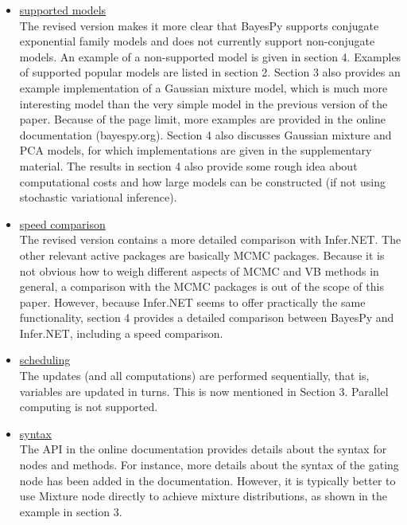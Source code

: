 \documentclass{article}
\begin{document}
\begin{itemize}

\item \underline{supported models}
  \\
  The revised version makes it more clear that BayesPy supports conjugate
  exponential family models and does not currently support non-conjugate models.
  An example of a non-supported model is given in section 4.  Examples of
  supported popular models are listed in section 2.  Section 3 also provides an
  example implementation of a Gaussian mixture model, which is much more
  interesting model than the very simple model in the previous version of the
  paper.  Because of the page limit, more examples are provided in the online
  documentation (bayespy.org).  Section 4 also discusses Gaussian mixture and
  PCA models, for which implementations are given in the supplementary material.
  The results in section 4 also provide some rough idea about computational
  costs and how large models can be constructed (if not using stochastic
  variational inference).

\item \underline{speed comparison}
  \\
  The revised version contains a more detailed comparison with Infer.NET.  The
  other relevant active packages are basically MCMC packages.  Because it is not
  obvious how to weigh different aspects of MCMC and VB methods in general, a
  comparison with the MCMC packages is out of the scope of this paper.  However,
  because Infer.NET seems to offer practically the same functionality, section 4
  provides a detailed comparison between BayesPy and Infer.NET, including a
  speed comparison.

\item \underline{scheduling}
  \\
  The updates (and all computations) are performed sequentially, that is,
  variables are updated in turns.  This is now mentioned in Section 3.  Parallel
  computing is not supported.

\item \underline{syntax}
  \\
  The API in the online documentation provides details about the syntax for
  nodes and methods.  For instance, more details about the syntax of the gating
  node has been added in the documentation.  However, it is typically better to
  use Mixture node directly to achieve mixture distributions, as shown in the
  example in section 3.

\end{itemize}
\end{document}
